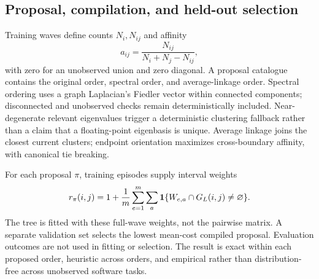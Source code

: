 \documentclass[11pt]{article}
\theoremstyle{definition}\newtheorem{definition}[theorem]{Definition}
\begin{document}
\subsection{Proposal, compilation, and held-out selection}
Training waves define counts $N_i,N_{ij}$ and affinity
\begin{equation}
 a_{ij}=\frac{N_{ij}}{N_i+N_j-N_{ij}},
\end{equation}
with zero for an unobserved union and zero diagonal. A proposal catalogue contains the original order, spectral order, and average-linkage order. Spectral ordering uses a graph Laplacian's Fiedler vector within connected components; disconnected and unobserved checks remain deterministically included. Near-degenerate relevant eigenvalues trigger a deterministic clustering fallback rather than a claim that a floating-point eigenbasis is unique. Average linkage joins the closest current clusters; endpoint orientation maximizes cross-boundary affinity, with canonical tie breaking.

For each proposal $\pi$, training episodes supply interval weights
\begin{equation}\label{eq:weight}
 r_\pi(i,j)=1+\frac1m\sum_{e=1}^m\sum_a
 \mathbf 1\{W_{e,a}\cap G_L(i,j)\ne\varnothing\}.
\end{equation}
The tree is fitted with these full-wave weights, not the pairwise matrix. A separate validation set selects the lowest mean-cost compiled proposal. Evaluation outcomes are not used in fitting or selection. The result is exact within each proposed order, heuristic across orders, and empirical rather than distribution-free across unobserved software tasks.
\end{document}
